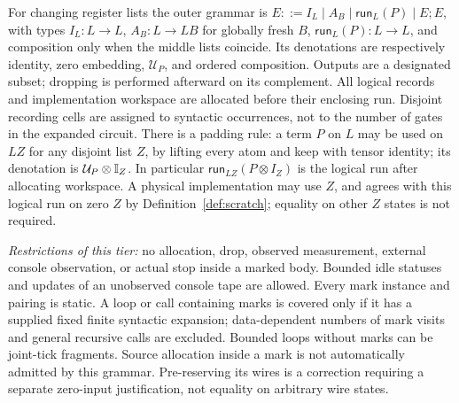\begin{definition}
For changing register lists the outer grammar is
$E::=I_L\mid A_B\mid\mathsf{run}_L(P)\mid E;E$,
with types $I_L:L\to L$, $A_B:L\to LB$ for globally fresh $B$,
$\mathsf{run}_L(P):L\to L$, and composition only when the middle
lists coincide. Its denotations are respectively identity, zero embedding,
$\mathcal U_P$, and ordered composition. Outputs are a
designated subset; dropping is performed afterward on its complement.
All logical records and implementation workspace are allocated before
their enclosing run. Disjoint recording cells are assigned to syntactic
occurrences, not to the number of gates in the expanded circuit.
There is a padding rule: a term $P$ on $L$ may be used on $LZ$ for any
disjoint list $Z$, by lifting every atom and keep with tensor identity;
its denotation is $\mathcal U_P\otimes\mathbb{I}_Z$. In particular
$\mathsf{run}_{LZ}(P\otimes I_Z)$ is the logical run after allocating
workspace. A physical implementation may use $Z$, and agrees with this
logical run on zero $Z$ by Definition~\ref{def:scratch}; equality on
other $Z$ states is not required.

\emph{Restrictions of this tier:} no allocation, drop, observed measurement,
external console observation, or actual stop inside a marked body. Bounded
idle statuses and updates of an unobserved console tape are allowed.
Every mark instance and pairing is static. A loop or call containing marks
is covered only if it has a supplied fixed finite syntactic expansion;
data-dependent numbers of mark visits and general recursive calls are
excluded. Bounded loops without marks can be joint-tick fragments.
Source allocation inside a mark is not automatically admitted by this
grammar. Pre-reserving its wires is a correction requiring a separate
zero-input justification, not equality on arbitrary wire states.
\end{definition}

